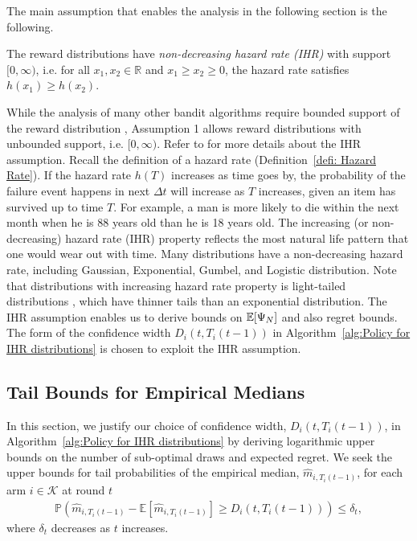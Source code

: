The main assumption that enables the analysis in the following section is the following.
\begin{ass}
\label{ass:IHR}
The reward distributions have \emph{non-decreasing hazard rate (IHR)} with support $[0, \infty)$, i.e. for all $x_1, x_2 \in \mathbb{R}$ and $x_1 \geq x_2 \geq 0$, the hazard rate satisfies $h(x_1) \geq h(x_2)$.
\end{ass}
While the analysis of many other bandit algorithms require bounded support of the reward distribution \cite{Auer2002, audibert2009exploration, cassel_general_2018}, Assumption 1 allows reward distributions with unbounded support, i.e. $[0,\infty)$.
Refer to \cite{boucheron2012} for more details about the IHR assumption.
Recall the definition of a hazard rate (Definition~\ref{defi: Hazard Rate}).
If the hazard rate $h(T)$ increases as time goes by, the probability of the failure event happens in next $\Delta t$ will increase as $T$ increases, given an item has survived up to time $T$.
For example, a man is more likely to die within the next month when he is 88 years old than he is 18 years old.
The increasing (or non-decreasing) hazard rate (IHR) property reflects the most natural life pattern that one would wear out with time.
Many distributions have a non-decreasing hazard rate, including Gaussian, Exponential, Gumbel, and Logistic distribution.
Note that distributions with increasing hazard rate property is light-tailed distributions \cite{rinne_hazard_nodate}, which have thinner tails than an exponential distribution.
The IHR assumption enables us to derive bounds on $\mathbb{E}[\Psi_N]$ and also regret bounds.
The form of the confidence width $D_i(t, T_i(t-1))$
in Algorithm~\ref{alg:Policy for IHR distributions} is chosen to exploit the IHR assumption.


\subsection{Tail Bounds for Empirical Medians}
\label{sec: Theorem}


In this section, we justify our choice of confidence width, $D_i(t, T_i(t-1))$, in
Algorithm~\ref{alg:Policy for IHR distributions} by deriving logarithmic upper bounds
on the number of sub-optimal draws and expected regret.
We seek the upper bounds for
tail probabilities of the empirical median, $\hat{m}_{i,T_i(t-1)}$,
for each arm $i \in \mathcal{K}$ at round $t$
\begin{align}
\label{equ: general form of concen ine for medians}
    \mathbb{P}\left(\hat{m}_{i,T_i(t-1)}- \mathbb{E}[\hat{m}_{i,T_i(t-1)}] \geq D_i\left(t, T_i\left(t-1\right)\right)\right) \leq \delta_t,
\end{align}
where $\delta_t$ decreases as $t$ increases.

